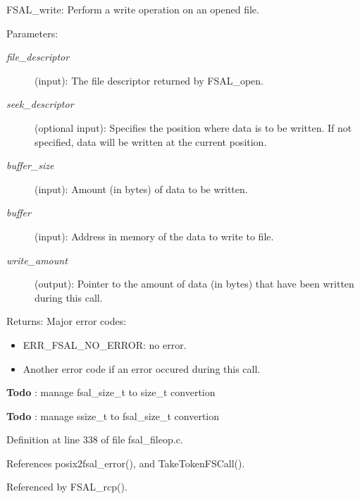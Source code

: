 FSAL\_\-write: Perform a write operation on an opened file.

\begin{Desc}
\item[Parameters:]
\begin{description}
\item[{\em file\_\-descriptor}](input): The file descriptor returned by FSAL\_\-open. \item[{\em seek\_\-descriptor}](optional input): Specifies the position where data is to be written. If not specified, data will be written at the current position. \item[{\em buffer\_\-size}](input): Amount (in bytes) of data to be written. \item[{\em buffer}](input): Address in memory of the data to write to file. \item[{\em write\_\-amount}](output): Pointer to the amount of data (in bytes) that have been written during this call.\end{description}
\end{Desc}
\begin{Desc}
\item[Returns:]Major error codes:\begin{itemize}
\item ERR\_\-FSAL\_\-NO\_\-ERROR: no error.\item Another error code if an error occured during this call. \end{itemize}
\end{Desc}


\begin{Desc}
\item[{\bf Todo}]: manage fsal\_\-size\_\-t to size\_\-t convertion \end{Desc}


\begin{Desc}
\item[{\bf Todo}]: manage ssize\_\-t to fsal\_\-size\_\-t convertion \end{Desc}


Definition at line 338 of file fsal\_\-fileop.c.

References posix2fsal\_\-error(), and TakeTokenFSCall().

Referenced by FSAL\_\-rcp().